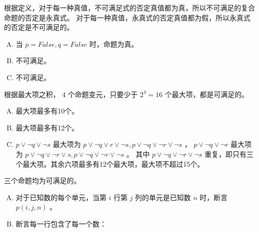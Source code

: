 {{        %
        \begin{practices}
            根据定义，对于每一种真值，不可满足式的否定真值都为真，所以不可满足的复合命题的否定是永真式。
            对于每一种真值，永真式的否定真值都为假，所以永真式的否定是不可满足的。
        \end{practices}

        \begin{practices}
            \begin{enumerate}[A.]
                \item
                {
                    当 $p = False, q = False$ 时，命题为真。
                }
                \item
                {
                    不可满足。
                }
                \item
                {
                    不可满足。
                }
            \end{enumerate}
        \end{practices}

        \begin{practices}
            根据最大项之积， $4$ 个命题变元，只要少于 $2^4 = 16$ 个最大项，都是可满足的。

            \begin{enumerate}[A.]
                \item
                {
                    最大项最多有10个。
                }
                \item
                {
                    最大项最多有12个。
                }
                \item
                {
                    $p \vee \neg q \vee \neg s$ 最大项为 $p \vee \neg q \vee r \vee \neg s, p \vee \neg q \vee \neg r \vee \neg s$ ， $p \vee \neg q \vee \neg r$ 最大项为 $p \vee \neg q \vee \neg r \vee s, p \vee \neg q \vee \neg r \vee \neg s$ 。
                    其中 $p \vee \neg q \vee \neg r \vee \neg s$ 重复，即只有三个最大项。其余六项最多有12个最大项，最大项不超过15个。
                }
            \end{enumerate}

            三个命题均为可满足的。
        \end{practices}

        \begin{practices}
            \begin{enumerate}[A.]
                \item
                {
                    对于已知数的每个单元，当第 $i$ 行第 $j$ 列的单元是已知数 $n$ 时，断言 $p(i, j, n)$ 。
                }
                \item
                {
                    断言每一行包含了每一个数：

}
\end{enumerate}
\end{practices}}}
